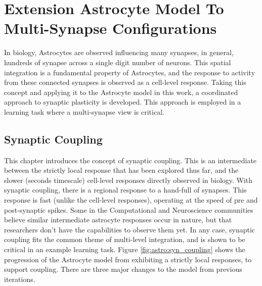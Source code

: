 \chapter{Extension Astrocyte Model To Multi-Synapse
  Configurations} \label{chapter:obj3}

In biology, Astrocytes are observed influencing many synapses, in general,
hundreds of synapse across a single digit number of neurons. This spatial
integration is a fundamental property of Astrocytes, and the response to
activity from these connected synapses is observed as a cell-level \ca
response. Taking this concept and applying it to the Astrocyte model
in this work, a coordinated approach to synaptic plasticity is developed. This
approach is employed in a learning task where a multi-synapse view is critical.



  

\section{Synaptic Coupling}
This chapter introduces the concept of synaptic coupling. This is an
intermediate between the strictly local response that has been explored thus
far, and the slower (seconds timescale) cell-level responses directly observed
in biology. With synaptic coupling, there is a regional response to a hand-full
of synapses.  This response is fast (unlike the cell-level \ca responses),
operating at the speed of pre and post-synaptic spikes. Some in the
Computational and Neuroscience communities believe similar intermediate
astrocyte responses occur in nature, but that researchers don't have the
capabilities to observe them yet. In any case, synaptic coupling fits the common
theme of multi-level integration, and is shown to be critical in an example
learning task. Figure \ref{fig:astro:syn_coupling} shows the progression of the
Astrocyte model from exhibiting a strictly local responses, to support
coupling. There are three major changes to the model from previous iterations.

